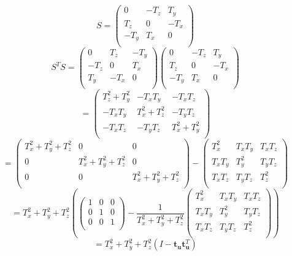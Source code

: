 \documentclass[11pt]{article}
\begin{document}
\begin{enumerate}
\begin{enumerate}
\[
S =
\begin{pmatrix}
    0 & -T_{z} & T_{y} \\
    T_{z} & 0 & - T_{x} \\
    - T_{y} & T_{x} & 0\\
\end{pmatrix}
\]
\[
S^TS =
\begin{pmatrix}
    0 & T_{z} & -T_{y} \\
    -T_{z} & 0 & T_{x} \\
    T_{y} & -T_{x} & 0\\
\end{pmatrix}
\begin{pmatrix}
    0 & -T_{z} & T_{y} \\
    T_{z} & 0 & - T_{x} \\
    - T_{y} & T_{x} & 0\\
\end{pmatrix}
\]
\[
 =
\begin{pmatrix}
    T_{z}^2 + T_{y}^2 & -T_{x}T_{y} & -T_{x}T_{z}\\
    -T_{x}T_{y} & T_{x}^2 + T_{z}^2 & -T_{y}T_{z}\\
    -T_{x}T_{z} & -T_{y}T_{z} & T_{x}^2 + T_{y}^2\\
\end{pmatrix}
\]
\[
 =
 \begin{pmatrix}
    T_{x}^2 + T_{y}^2 + T_{z}^2 & 0 & 0\\
    0 & T_{x}^2 + T_{y}^2 + T_{z}^2 & 0\\
    0 & 0 & T_{x}^2 + T_{y}^2 + T_{z}^2\\
\end{pmatrix} -
\begin{pmatrix}
    T_{x}^2 & T_{x}T_{y} & T_{x}T_{z}\\
    T_{x}T_{y} & T_{y}^2 & T_{y}T_{z}\\
    T_{x}T_{z} & T_{y}T_{z} & T_{z}^2\\
\end{pmatrix}
\]
\[
 = T_{x}^2 + T_{y}^2 + T_{z}^2 (
 \begin{pmatrix}
    1 & 0 & 0\\
    0 & 1 & 0\\
    0 & 0 & 1\\
\end{pmatrix} -
\frac{1}{T_{x}^2 + T_{y}^2 + T_{z}^2}
\begin{pmatrix}
    T_{x}^2 & T_{x}T_{y} & T_{x}T_{z}\\
    T_{x}T_{y} & T_{y}^2 & T_{y}T_{z}\\
    T_{x}T_{z} & T_{y}T_{z} & T_{z}^2\\
\end{pmatrix})
\]
\[
 = T_{x}^2 + T_{y}^2 + T_{z}^2 (I -
\textbf{t}_\textbf{u} \textbf{t}^T_\textbf{u})
\]


\end{enumerate}
\end{enumerate}
\end{document}
